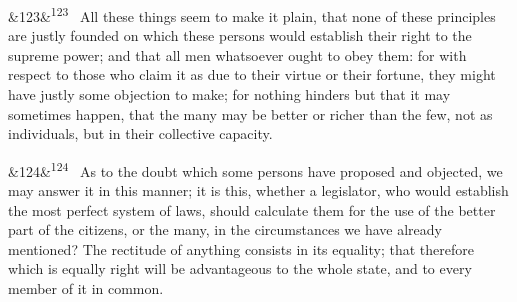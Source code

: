 \documentclass[12pt]{article}
\newcommand{\para}[1][]{\par\noindent\ifx&#1&\else\textsuperscript{\footnotesize #1}~\fi}
\begin{document}
\para[123] All these things seem to make it plain, that none of these principles are justly founded on which these persons would establish their right to the supreme power; and that all men whatsoever ought to obey them: for with respect to those who claim it as due to their virtue or their fortune, they might have justly some objection to make; for nothing hinders but that it may sometimes happen, that the many may be better or richer than the few, not as individuals, but in their collective capacity.

\para[124] As to the doubt which some persons have proposed and objected, we may answer it in this manner; it is this, whether a legislator, who would establish the most perfect system of laws, should calculate them for the use of the better part of the citizens, or the many, in the circumstances we have already mentioned? The rectitude of anything consists in its equality; that therefore which is equally right will be advantageous to the whole state, and to every member of it in common.
\end{document}

